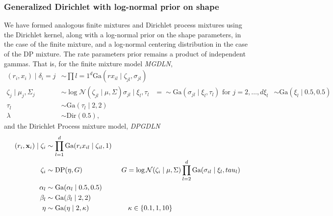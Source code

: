 \subsubsection{Generalized Dirichlet with log-normal prior on shape}
We have formed analogous finite mixtures and Dirichlet process mixtures using the Dirichlet kernel,
  along with a log-normal prior on the shape parameters, in the case of the finite mixture, and a
  log-normal centering distribution in the case of the DP mixture.  The rate parameters prior remains
  a product of independent gammas.  That is, for the finite mixture model \emph{MGDLN},
  \begin{equation}
    \begin{aligned}
      (r_i, x_i) \mid \delta_i=j &\sim \prod{l = 1}^d\text{Ga}(rx_{il}\mid \zeta_{jl}, \sigma_{jl})\\
      \zeta_{j} \mid \mu_j, \Sigma_j &\sim \log\mathcal{N}(\zeta_{jl}\mid \mu,\Sigma)
      \sigma_{jl} \mid \xi_l, \tau_l &=\sim \text{Ga}(\sigma_{jl}\mid \xi_l, \tau_l)
                                                                \text{ for }j = 2,\ldots,d
      \xi_l &\sim \text{Ga}(\xi_l\mid 0.5, 0.5)\\
      \tau_l &\sim \text{Ga}(\tau_l\mid 2, 2)\\
      \lambda &\sim \text{Dir}(0.5),
    \end{aligned}
  \end{equation}
  and the Dirichlet Process mixture model, \emph{DPGDLN}
  \begin{equation}
    \begin{aligned}
      (r_i, {\bf x}_i) \mid \zeta_i &\sim \prod_{l = 1}^d\text{Ga}(r_ix_{il}\mid \zeta_{il}, 1)\\
        \zeta_i &\sim \text{DP}(\eta, G)\hspace{2cm}G = \log\mathcal{N}(\zeta_i\mid\mu,\Sigma)
                                          \prod_{l = 2}^d \text{Ga}(\sigma_{il}\mid \xi_l,tau_l)\\
        \alpha_l &\sim \text{Ga}(\alpha_l \mid 0.5, 0.5)\\
        \beta_l &\sim \text{Ga}(\beta_l \mid 2, 2)\\
        \eta &\sim \text{Ga}(\eta \mid 2, \kappa) \hspace{2cm}\kappa \in \lbrace 0.1, 1, 10\rbrace
    \end{aligned}
  \end{equation}







